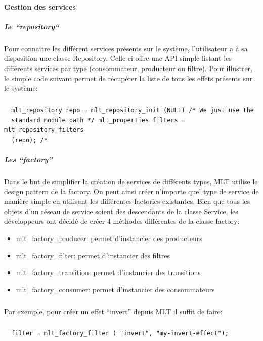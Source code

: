 \paragraph{Gestion des services}

\subparagraph{Le ``repository``}

Pour connaitre les différent services
présents sur le système, l'utilisateur a à sa disposition une classe Repository. Celle-ci
offre une API simple listant les différents services par type
(consommateur, producteur ou filtre).  Pour illustrer, le simple code
suivant permet de récupérer la liste de tous les effets présents
sur le système:

\subparagraph{}

\begin{lstlisting}
  mlt_repository repo = mlt_repository_init (NULL) /* We just use the
  standard module path */ mlt_properties filters = mlt_repository_filters
  (repo); /*
\end{lstlisting}

\subparagraph{Les ``factory''}
Dans le but de simplifier la création de services de différents
types, MLT utilise le design pattern de la factory. On peut ainsi
créer n'importe quel type de service de manière simple en utilisant les
différentes factories existantes. Bien que tous les objets d'un réseau
de service soient des descendants de la classe Service, les développeurs
ont décidé de créer 4 méthodes différentes de la classe factory:

\begin{itemize}

  \item {mlt\_factory\_producer: permet d'instancier des producteurs}

  \item {mlt\_factory\_filter: permet d'instancier des filtres}

  \item {mlt\_factory\_transition: permet d'instancier des transitions}

  \item {mlt\_factory\_consumer: permet d'instancier des consommateurs}

\end{itemize}

\subparagraph{}

Par exemple, pour créer un effet ``invert'' depuis MLT il suffit
de faire:

\subparagraph{}

\begin{lstlisting}
  filter = mlt_factory_filter ( "invert", "my-invert-effect");
\end{lstlisting}


